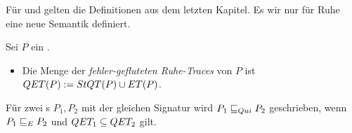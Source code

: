 Für \ET{} und \EL{} gelten die Definitionen aus dem letzten Kapitel. Es wir nur
für Ruhe eine neue Semantik definiert.

\begin{Def}
  \label{RuheSemDef}
  Sei $P$ ein \MEIO{}.
  \begin{itemize}
    \item Die Menge der \emph{fehler-gefluteten Ruhe-Traces} von $P$ ist $QET
      (P):= StQT (P)\cup ET (P)$.
  \end{itemize}
  Für zwei \MEIO{}s $P_1,P_2$ mit der gleichen Signatur wird $P_1 \sqsubseteq  _{Qui}{} P_2$
  geschrieben, wenn $P_1 \sqsubseteq  _E{} P_2$ und $QET _1\subseteq QET _2$ gilt.
\end{Def}

\vspace{0.2cm}

